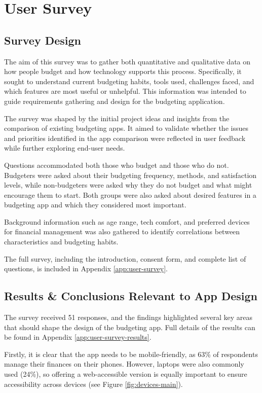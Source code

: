 \documentclass{l4proj}
\begin{document}
\section{User Survey}
\label{sec:user-survey}
\subsection{Survey Design}
The aim of this survey was to gather both quantitative and qualitative data on how people budget and how technology supports this process. Specifically, it sought to understand current budgeting habits, tools used, challenges faced, and which features are most useful or unhelpful. This information was intended to guide requirements gathering and design for the budgeting application.

The survey was shaped by the initial project ideas and insights from the comparison of existing budgeting apps. It aimed to validate whether the issues and priorities identified in the app comparison were reflected in user feedback while further exploring end-user needs.

Questions accommodated both those who budget and those who do not. Budgeters were asked about their budgeting frequency, methods, and satisfaction levels, while non-budgeters were asked why they do not budget and what might encourage them to start. Both groups were also asked about desired features in a budgeting app and which they considered most important.

Background information such as age range, tech comfort, and preferred devices for financial management was also gathered to identify correlations between characteristics and budgeting habits.

The full survey, including the introduction, consent form, and complete list of questions, is included in Appendix \ref{app:user-survey}.

\subsection{Results \& Conclusions Relevant to App Design}

The survey received 51 responses, and the findings highlighted several key areas that should shape the design of the budgeting app. Full details of the results can be found in Appendix \ref{app:user-survey-results}.

Firstly, it is clear that the app needs to be mobile-friendly, as 63\% of respondents manage their finances on their phones. However, laptops were also commonly used (24\%), so offering a web-accessible version is equally important to ensure accessibility across devices (see Figure \ref{fig:devices-main}).
\end{document}
